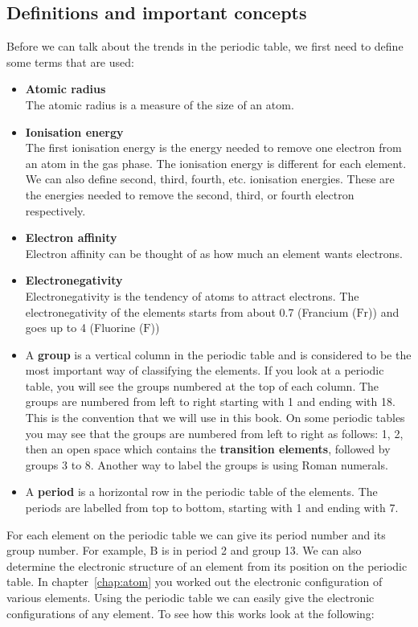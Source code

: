 \subsection*{Definitions and important concepts}
Before we can talk about the trends in the periodic table, we first need to define some terms that are used:
\begin{itemize}[noitemsep]
\item \textbf{Atomic radius} \\
The atomic radius is a measure of the size of an atom. 
\item \textbf{Ionisation energy}\\
The first ionisation energy is the energy needed to remove one electron from an atom in the gas phase. The ionisation energy is different for each element. We can also define second, third, fourth, etc. ionisation energies. These are the energies needed to remove the second, third, or fourth electron respectively. 
\item \textbf{Electron affinity}\\
Electron affinity can be thought of as how much an element wants electrons.
\item \textbf{Electronegativity}\\
Electronegativity is the tendency of atoms to attract electrons. The electronegativity of the elements starts from about 0.7 (Francium ($\text{Fr}$)) and goes up to 4 (Fluorine ($\text{F}$))
\item A \textbf{group} is a vertical column in the periodic table and is considered to be the most important way of classifying the elements. If you look at a periodic table, you will see the groups numbered at the top of each column. The groups are numbered from left to right starting with 1 and ending with 18. This is the convention that we will use in this book. On some periodic tables you may see that the groups are numbered from left to right  as follows: 1, 2, then an open space which contains the \textbf{transition elements}, followed by groups 3 to 8. Another way to label the groups is using Roman numerals.
\item A \textbf{period} is a horizontal row in the periodic table of the elements. The periods are labelled from top to bottom, starting with 1 and ending with 7.
\end{itemize}
For each element on the periodic table we can give its period number and its group number. For example, $\text{B}$ is in period 2 and group 13. We can also determine the electronic structure of an element from its position on the periodic table. In chapter~\ref{chap:atom} you worked out the electronic configuration of various elements. Using the periodic table we can easily give the electronic configurations of any element. To see how this works look at the following: \\
